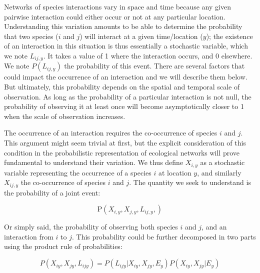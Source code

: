 \documentclass[12pt]{article}
\begin{document}
Networks of species interactions vary in space and time because any given
pairwise interaction could either occur or not at any particular location.
Understanding this variation amounts to be able to determine the probability
that two species ($i$ and $j$) will interact at a given time/location ($y$);
the existence of an interaction in this situation is thus essentially a
stochastic variable, which we note $L_{ij,y}$. It takes a value of 1 where the
interaction occurs, and 0 elsewhere. We note $P(L_{ij,y})$ the probability
of this event. There are several factors that could impact the occurrence
of an interaction and we will describe them below. But ultimately, this
probability depends on the spatial and temporal scale of observation. As long
as the probability of a particular interaction is not null, the probability
of observing it at least once will become asymptotically closer to 1 when
the scale of observation increases.

The occurrence of an interaction requires the co-occurrence of species $i$ and
$j$. This argument might seem trivial at first, but the explicit consideration
of this condition in the probabilistic representation of ecological networks
will prove fundamental to understand their variation.
We thus define $X_{i,y}$
as a stochastic variable representing the occurrence of a species $i$ at
location $y$, and similarly $X_{ij,y}$ the co-occurrence of species $i$ and
$j$. The quantity we seek to understand is the probability of a joint event:

\begin{equation}
   \text{P}(X_{i,y},X_{j,y},L_{ij,y},)
\end{equation}

Or simply said, the probability of observing both species $i$ and $j$, and
an interaction from $i$ to $j$. This probability could be further decomposed
in two parts using the product rule of probabilities:

\begin{equation}
	P(X_{iy},X_{jy},L_{ijy})=P(L_{ijy}|X_{iy},X_{jy},E_y)P(X_{iy},X_{jy}|E_y)
\end{equation}
\end{document}
